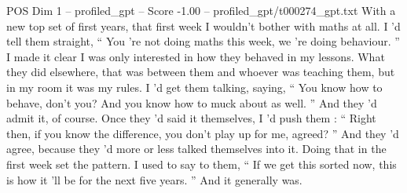\begin{textsample}{POS Dim 1 – profiled\_gpt – Score -1.00 – profiled\_gpt/t000274\_gpt.txt}  \label{ex:f1_pos_039}
With a new top set of first years, that first week I wouldn't bother with maths at all.
I ’d tell them straight, “ You ’re not doing maths this week, we ’re doing behaviour. ” I made it clear I was only interested in how they behaved in my lessons.
What they did elsewhere, that was between them and whoever was teaching them, but in my room it was my rules.
I ’d get them talking, saying, “ You know how to behave, don't you?
And you know how to muck about as well. ” And they ’d admit it, of course.
Once they ’d said it themselves, I ’d push them : “ Right then, if you know the difference, you don't play up for me, agreed? ” And they ’d agree, because they ’d more or less talked themselves into it.
Doing that in the first week set the pattern.
I used to say to them, “ If we get this sorted now, this is how it ’ll be for the next five years. ” And it generally was.

\end{textsample}
